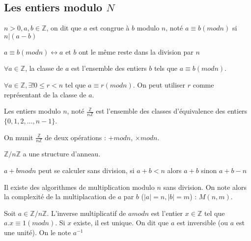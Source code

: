 \documentclass[a4paper, 10pt]{thesis}
\begin{document}
\subsection{Les entiers modulo $N$}

\begin{df}
    $n>0, a, b \in \mathbb{Z}$, on dit que $a$ est congrue à $b$ modulo $n$, noté $a \equiv b (mod
    n)$ si $n|(a-b)$
\end{df}

\begin{prop}
    $a \equiv b (mod n) \leftrightarrow a \mbox{ et } b$ ont le même reste dans la division par $n$
\end{prop}

\begin{df}
    $\forall a \in \mathbb{Z}$, la classe de $a$ est l'ensemble des entiers $b$ tels que $a \equiv b
    (mod n)$.
\end{df}

\begin{prop}
    $\forall a \in \mathbb{Z}, \exists ! 0 \leq r < n$ tel que $a \equiv r (mod n)$. On peut utiliser
    $r$ comme représentant de la classe de $a$.
\end{prop}

\begin{df}
    Les entiers modulo $n$, noté $\frac{\mathbb{Z}}{n\mathbb{Z}}$ est l'ensemble des classes
    d'équivalence des entiers $\{0, 1, 2, \dots, n-1\}$.
\end{df}

On munit $\frac{\mathbb{Z}}{n\mathbb{Z}}$ de deux opérations : $+ mod n$, $\times mod n$.

\begin{rq}
    $\mathbb{Z}/n\mathbb{Z}$ a une structure d'anneau.
\end{rq}

\begin{rq}
    $a+b mod n$ peut se calculer sans division, si $a+b < n$ alors $a+b$ sinon $a + b -n$
\end{rq}

\begin{rq}
    Il existe des algorithmes de multiplication modulo $n$ sans division. On note alors la
    complexité de la multiplacation de $a$ par $b$ ($|a| = n, |b| = m$) : $M(n,m)$.
\end{rq}

\begin{df}
    Soit $a \in \mathbb{Z}/n\mathbb{Z}$. L'inverse multiplicatif de $a mod n$ est l'entier $x \in
    \mathbb{Z}$ tel que $a.x \equiv 1 (mod n)$. Si $x$ existe, il est unique. On dit que $a$ est
    inversible (ou $a$ est une unité). On le note $a^{-1}$
\end{df}
\end{document}
